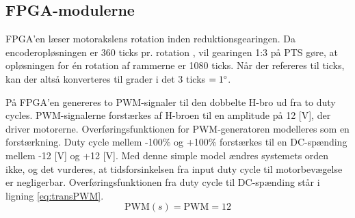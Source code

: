 \subsection{FPGA-modulerne}
\label{subsec:matFPGA}
FPGA'en læser motorakslens rotation inden reduktionsgearingen.
Da encoderopløsningen er 360 ticks pr. rotation \citep{emgmotor},
vil gearingen 1:3 på PTS gøre, at opløsningen for én rotation af rammerne er 1080 ticks.
Når der refereres til ticks, kan der altså konverteres til grader i det \(3\) ticks \( = 1\degree\).

På FPGA'en genereres to PWM-signaler til den dobbelte H-bro ud fra to
duty cycles.
PWM-signalerne forstærkes af H-broen til en amplitude på 12 [V],
der driver motorerne.
Overførings\-funktionen for PWM-generatoren %
modelleres som en forstærkning. 
Duty cycle mellem -100\% og +100\% forstærkes
til en DC-spænding mellem -12 [V] og +12 [V]. Med denne simple model ændres systemets orden ikke,
og det vurderes, at tidsforsinkelsen fra input duty cycle til motorbevægelse er negligerbar. 
Overføringsfunktionen fra duty cycle til DC-spænding står i ligning \ref{eq:transPWM}.
\begin{equation}
	\text{PWM}\left(s\right)=\text{PWM}=12
	\label{eq:transPWM}
\end{equation}

